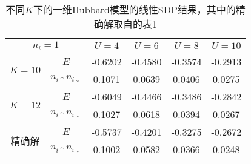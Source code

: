 
\begin{table}
    \caption{不同$K$下的一维Hubbard模型的线性SDP结果，其中的精确解取自\parencite{han_manybody}的表1}
    \label{tbl:hubbard-1d-linear-sdp}
    \centering
    \begin{tabular}{cccccc}
        \toprule
        \multicolumn{2}{c}{$n_i=1$}                                 & $U=4$   & $U=6$   & $U=8$   & $U=10$  \\
        \midrule
        \multirow{2}{*}{$K=10$} & $E$                               & -0.6202 & -0.4580 & -0.3574 & -0.2913  \\
                                & $n_{i \uparrow} n_{i \downarrow}$ &  0.1071 &  0.0639 &  0.0406 &  0.0275 \\
        \midrule
        \multirow{2}{*}{$K=12$} & $E$                               & -0.6049 & -0.4466 & -0.3486 & -0.2842  \\
                                & $n_{i \uparrow} n_{i \downarrow}$ &  0.1027 &  0.0618 &  0.0394 &  0.0267  \\
        \midrule
        \multirow{2}{*}{精确解}  & $E$                               & -0.5737 & -0.4201 & -0.3275 & -0.2672  \\
                                & $n_{i \uparrow} n_{i \downarrow}$ &  0.1002 &  0.0582 &  0.0366 &  0.0248  \\
        \bottomrule
    \end{tabular}
\end{table}